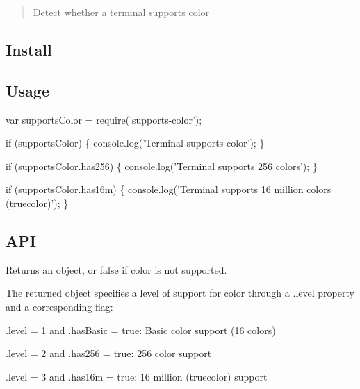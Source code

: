 \begin{quote}
Detect whether a terminal supports color \end{quote}


\subsection*{Install}




\subsection*{Usage}


\begin{DoxyCode}
var supportsColor = require(\textcolor{stringliteral}{'supports-color'});

\textcolor{keywordflow}{if} (supportsColor) \{
    console.log(\textcolor{stringliteral}{'Terminal supports color'});
\}

\textcolor{keywordflow}{if} (supportsColor.has256) \{
    console.log(\textcolor{stringliteral}{'Terminal supports 256 colors'});
\}

\textcolor{keywordflow}{if} (supportsColor.has16m) \{
    console.log(\textcolor{stringliteral}{'Terminal supports 16 million colors (truecolor)'});
\}
\end{DoxyCode}


\subsection*{A\+P\+I}

Returns an {\ttfamily object}, or {\ttfamily false} if color is not supported.

The returned object specifies a level of support for color through a {\ttfamily .level} property and a corresponding flag\+:


\begin{DoxyItemize}
\item {\ttfamily .level = 1} and {\ttfamily .has\+Basic = true}\+: Basic color support (16 colors)
\item {\ttfamily .level = 2} and {\ttfamily .has256 = true}\+: 256 color support
\item {\ttfamily .level = 3} and {\ttfamily .has16m = true}\+: 16 million (truecolor) support
\end{DoxyItemize}

